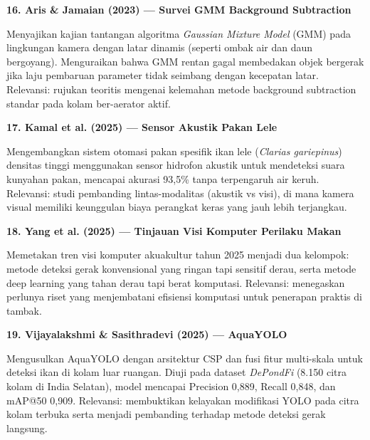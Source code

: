 \documentclass[11pt,a4paper]{article}
\begin{document}
\noindent\textbf{16. Aris \& Jamaian (2023) --- Survei GMM Background Subtraction}\par
\noindent Menyajikan kajian tantangan algoritma \textit{Gaussian Mixture Model} (GMM) pada lingkungan kamera dengan latar dinamis (seperti ombak air dan daun bergoyang). Menguraikan bahwa GMM rentan gagal membedakan objek bergerak jika laju pembaruan parameter tidak seimbang dengan kecepatan latar. Relevansi: rujukan teoritis mengenai kelemahan metode background subtraction standar pada kolam ber-aerator aktif.
\vspace{0.7em}

\noindent\textbf{17. Kamal et al. (2025) --- Sensor Akustik Pakan Lele}\par
\noindent Mengembangkan sistem otomasi pakan spesifik ikan lele (\textit{Clarias gariepinus}) densitas tinggi menggunakan sensor hidrofon akustik untuk mendeteksi suara kunyahan pakan, mencapai akurasi 93,5\% tanpa terpengaruh air keruh. Relevansi: studi pembanding lintas-modalitas (akustik vs visi), di mana kamera visual memiliki keunggulan biaya perangkat keras yang jauh lebih terjangkau.
\vspace{0.7em}

\noindent\textbf{18. Yang et al. (2025) --- Tinjauan Visi Komputer Perilaku Makan}\par
\noindent Memetakan tren visi komputer akuakultur tahun 2025 menjadi dua kelompok: metode deteksi gerak konvensional yang ringan tapi sensitif derau, serta metode deep learning yang tahan derau tapi berat komputasi. Relevansi: menegaskan perlunya riset yang menjembatani efisiensi komputasi untuk penerapan praktis di tambak.
\vspace{0.7em}

\noindent\textbf{19. Vijayalakshmi \& Sasithradevi (2025) --- AquaYOLO}\par
\noindent Mengusulkan AquaYOLO dengan arsitektur CSP dan fusi fitur multi-skala untuk deteksi ikan di kolam luar ruangan. Diuji pada dataset \textit{DePondFi} (8.150 citra kolam di India Selatan), model mencapai Precision 0,889, Recall 0,848, dan mAP@50 0,909. Relevansi: membuktikan kelayakan modifikasi YOLO pada citra kolam terbuka serta menjadi pembanding terhadap metode deteksi gerak langsung.
\end{document}
